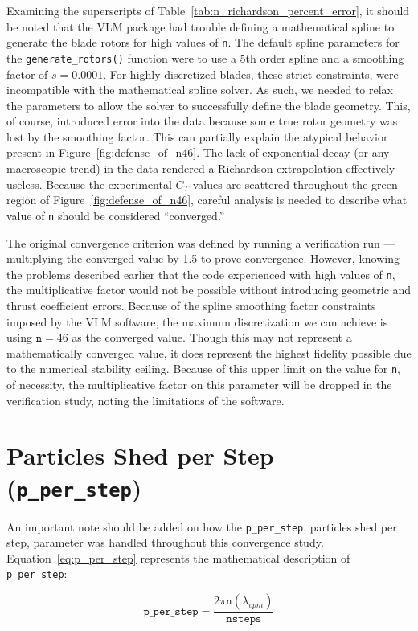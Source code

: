 \documentclass{report}
\begin{document}
Examining the superscripts of Table~\ref{tab:n_richardson_percent_error}, it should be noted that the VLM package had trouble defining a mathematical spline to generate the blade rotors for high values of \texttt{n}.
The default spline parameters for the \texttt{generate\_rotors()} function were to use a 5th order spline and a smoothing factor of $s = 0.0001$. For highly discretized blades, these strict constraints, were incompatible with the mathematical spline solver. As such, we needed to relax the parameters to allow the solver to successfully define the blade geometry.
This, of course, introduced error into the data because some true rotor geometry was lost by the smoothing factor. This can partially explain the atypical behavior present in Figure~\ref{fig:defense_of_n46}.
The lack of exponential decay (or any macroscopic trend) in the data rendered a Richardson extrapolation effectively useless.
Because the experimental $C_T$ values are scattered throughout the green region of Figure~\ref{fig:defense_of_n46}, careful analysis is needed to describe what value of \texttt{n} should be considered ``converged.''

The original convergence criterion was defined by running a verification run --- multiplying the converged value by 1.5 to prove convergence.
However, knowing the problems described earlier that the code experienced with high values of \texttt{n}, the multiplicative factor would not be possible without introducing geometric and thrust coefficient errors.
Because of the spline smoothing factor constraints imposed by the VLM software, the maximum discretization we can achieve is using $\texttt{n} = 46$ as the converged value. Though this may not represent a mathematically converged value, it does represent the highest fidelity possible due to the numerical stability ceiling.
Because of this upper limit on the value for \texttt{n}, of necessity, the multiplicative factor on this parameter will be dropped in the verification study, noting the limitations of the software.


\section{Particles Shed per Step (\texttt{p\_per\_step})}
An important note should be added on how the \texttt{p\_per\_step}, particles shed per step, parameter was handled throughout this convergence study.
Equation~\ref{eq:p_per_step} represents the mathematical description of \texttt{p\_per\_step}:


\begin{equation}\label{eq:p_per_step}
\texttt{p\_per\_step} = \frac{2 \pi \texttt{n} (\lambda_{vpm})}{\texttt{nsteps}}
\end{equation}
\end{document}
